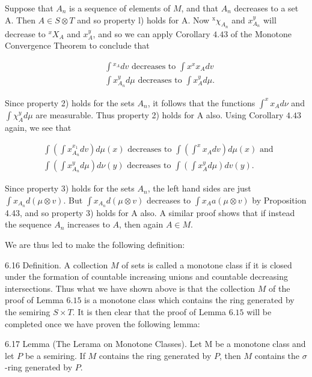 {{{Suppose that $A_{n}$ is a sequence of elements of $M$, and that $A_{n}$ decreases to a set A. Then $A \in S \otimes T$ and so property l) holds for A. Now ${ }^{\mathrm{x}} \chi_{A_{n}}$ and $x_{A_{n}}^{y}$ will decrease to ${ }^{x} X_{A}$ and $x_{A}^{y}$, and so we can apply Corollary $4.43$ of the Monotone Convergence Theorem to conclude that

$$
\begin{aligned}
&\int{ }^{x_{A}} d v \text { decreases to } \int x^{x} x_{A} d v \\
&\int x_{A_{n}}^{y} d \mu \text { decreases to } \int x_{A}^{y} d \mu .
\end{aligned}
$$

Since property 2) holds for the sets $A_{n}$, it follows that the functions $\int^{x} x_{A} d \nu$ and $\int \chi_{A}^{y} d \mu$ are measurable. Thus property 2) holds for A also. Using Corollary $4.43$ again, we see that

$$
\begin{aligned}
&\int\left(\int x_{A_{n}}^{x_{1}} d v\right) d \mu(x) \text { decreases to } \int\left(\int^{x} x_{A} d v\right) d \mu(x) \text { and } \\
&\int\left(\int x_{A_{n}}^{y} d \mu\right) d \nu(y) \text { decreases to } \int\left(\int x_{A}^{y} d \mu\right) d v(y) .
\end{aligned}
$$

Since property 3) holds for the sets $A_{n}$, the left hand sides are just $\int x_{A_{n}} d(\mu \otimes v)$. But $\int x_{A_{n}} d(\mu \otimes v)$ decreases to $\int x_{A} a(\mu \otimes v)$ by Proposition 4.43, and so property 3) holds for A also. A similar proof shows that if instead the sequence $A_{n}$ increases to $A$, then again $A \in M$.

We are thus led to make the following definition:

6.16 Definition. A collection $M$ of sets is called a monotone class if it is closed under the formation of countable increasing unions and countable decreasing intersections. Thus what we have shown above is that the collection $M$ of the proof of Lemma $6.15$ is a monotone class which contains the ring generated by the semiring $S \times T$. It is then clear that the proof of Lemma $6.15$ will be completed once we have proven the following lemma:

6.17 Lemma (The Lerama on Monotone Classes). Let M be a monotone class and let $P$ be a semiring. If $M$ contains the ring generated by $P$, then $M$ contains the $\sigma$-ring generated by $P$.

}}}
